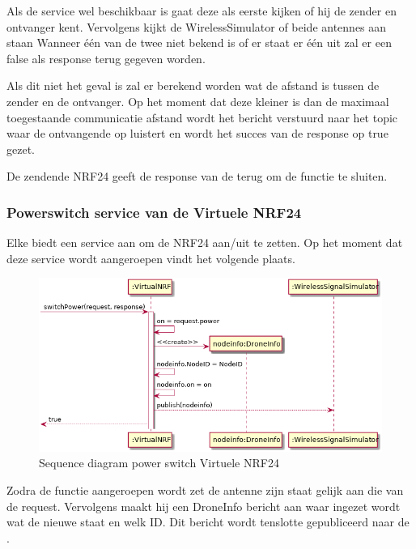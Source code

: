 \documentclass[a4paper, 11pt, oneside]{report}
\begin{document}
Als de service wel beschikbaar is gaat deze als eerste kijken of hij de zender en ontvanger kent.
Vervolgens kijkt de WirelessSimulator of beide antennes aan staan
Wanneer één van de twee niet bekend is of er staat er één uit zal er een false als response terug gegeven worden.

Als dit niet het geval is zal er berekend worden wat de afstand is tussen de zender en de ontvanger.
Op het moment dat deze kleiner is dan de maximaal toegestaande communicatie afstand wordt het bericht verstuurd naar het topic waar de ontvangende  op luistert en wordt het succes van de response op true gezet.

De zendende NRF24 geeft de response van de  terug om de functie te sluiten.

\subsubsection{Powerswitch service van de Virtuele NRF24}
\label{DetailedDesign:ros:sequence:powerswitch}

Elke  biedt een service aan om de NRF24 aan/uit te zetten.
Op het moment dat deze service wordt aangeroepen vindt het volgende plaats. 

\begin{figure}[H]
	\begin{center}\includegraphics[width=.8\linewidth]{UML/out/ros/sequence/powerSwitch/powerSwitch.png}\end{center}
	\caption{Sequence diagram power switch Virtuele NRF24}
	\label{fig:ros:sequence:sequence:powerswitch}
\end{figure}

Zodra de functie aangeroepen wordt zet de antenne zijn staat gelijk aan die van de request.
Vervolgens maakt hij een DroneInfo bericht aan waar ingezet wordt wat de nieuwe staat en welk ID.
Dit bericht wordt tenslotte gepubliceerd naar de .
\end{document}
